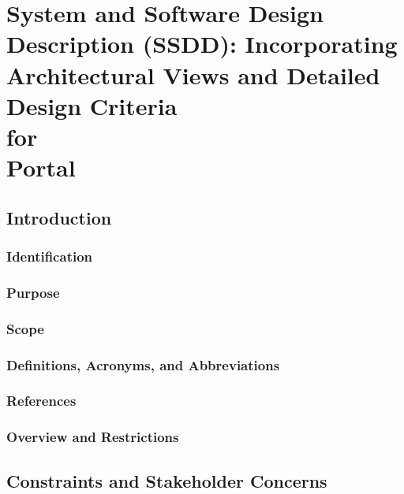 \documentclass[12pt, oneside, letterpaper]{report}
\begin{document}
\part{System and Software Design Description (SSDD): Incorporating
     Architectural Views and Detailed Design Criteria \\ for \\ Portal}
\tableofcontents                                %
\listoffigures
\listoftables
\chapter{Introduction}


	\section{Identification}
		
	\section{Purpose}
		
	\section{Scope}
		
	\section{Definitions, Acronyms, and Abbreviations}
		
	\section{References}
		
	\section{Overview and Restrictions}
		

\nopagebreak
\chapter{Constraints and Stakeholder Concerns}
\end{document}
